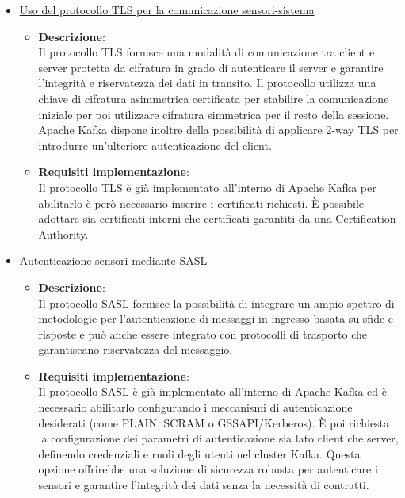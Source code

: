 \documentclass[10pt]{article}
\begin{document}
\begin{itemize}
\begin{itemize}
\begin{itemize}
                \end{itemize}

                \item \underline{Uso del protocollo TLS per la comunicazione sensori-sistema}
                \begin{itemize}
                    \item \textbf{Descrizione}:\\
                    Il protocollo TLS fornisce una modalità di comunicazione tra client e server protetta da cifratura
                    in grado di autenticare il server e garantire l'integrità e riservatezza dei dati in transito.
                    Il protocollo utilizza una chiave di cifratura asimmetrica certificata per stabilire la comunicazione iniziale
                    per poi utilizzare cifratura simmetrica per il resto della sessione.
                    Apache Kafka dispone inoltre della possibilità di applicare 2-way TLS per introdurre un'ulteriore autenticazione del client.

                    \item \textbf{Requisiti implementazione}:\\
                    Il protocollo TLS è già implementato all'interno di Apache Kafka per abilitarlo è però necessario inserire i certificati richiesti.
                    È possibile adottare sia certificati interni che certificati garantiti da una Certification Authority.

                \end{itemize}

                \item \underline{Autenticazione sensori mediante SASL}
                \begin{itemize}
                    \item \textbf{Descrizione}:\\
                    Il protocollo SASL fornisce la possibilità di integrare un ampio spettro di metodologie per l'autenticazione di messaggi in ingresso basata su sfide e risposte e
                    può anche essere integrato con protocolli di trasporto che garantiscano riservatezza del messaggio.

                    \item \textbf{Requisiti implementazione}:\\
                    Il protocollo SASL è già implementato all'interno di Apache Kafka ed è necessario abilitarlo configurando i meccanismi di autenticazione desiderati (come PLAIN, SCRAM o GSSAPI/Kerberos).
                    È poi richiesta la configurazione dei parametri di autenticazione sia lato client che server, definendo credenziali e ruoli degli utenti nel cluster Kafka.
                    Questa opzione offrirebbe una soluzione di sicurezza robusta per autenticare i sensori e garantire l'integrità dei dati senza la necessità di contratti.


\end{itemize}
\end{itemize}
\end{itemize}
\end{document}
